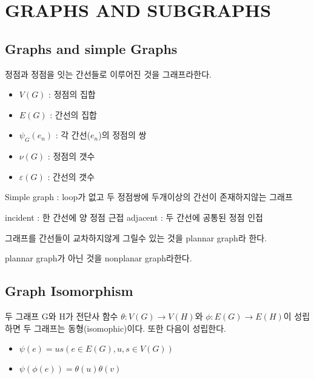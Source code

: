 

\section{GRAPHS AND SUBGRAPHS}
\subsection{Graphs and simple Graphs}
\begin{dfn}[Graph] 정점과 정점을 잇는 간선들로 이루어진 것을 그래프라한다.
    \begin{itemize}
        \item $V(G)$ :  정점의 집합
        \item $E(G)$ :  간선의 집합
        \item $\psi_G(e_n)$ :  각 간선($e_n$)의 정점의 쌍
        \item $\nu(G)$ :  정점의 갯수 
        \item $\varepsilon(G)$ :  간선의 갯수
    \end{itemize}

    Simple graph : loop가 없고 두 정점쌍에 두개이상의 간선이 존재하지않는 그래프

    incident : 한 간선에 양 정점 근접
    adjacent : 두 간선에 공통된 정점 인접
\end{dfn}

\begin{dfn}[planar]

    그래프를 간선들이 교차하지않게 그릴수 있는 것을 plannar graph라 한다. 
    
    plannar graph가 아닌 것을 nonplanar graph라한다.
\end{dfn}

\subsection{Graph Isomorphism}

\begin{dfn}[isomophic] 두 그래프 G와 H가  전단사 함수 $\theta : V(G) \longrightarrow V(H)$와 $\phi : E(G) \rightarrow E(H)$이 성립하면 두 그래프는 동형(isomophic)이다.
    또한 다음이 성립한다.
\begin{itemize}
    \item $\psi(e) = us( e \in E(G), u,s \in V(G)) $
    \item $\psi(\phi(e)) = \theta(u)\theta(v)$%
\end{itemize}
\end{dfn}

